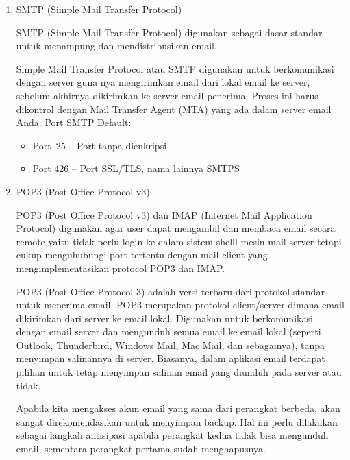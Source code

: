 \begin{enumerate}
\item SMTP (Simple Mail Transfer Protocol) \par
SMTP (Simple Mail Transfer Protocol) digunakan sebagai dasar standar untuk menampung dan mendistribusikan email. \par
\vspace{12pt}
Simple Mail Transfer Protocol atau SMTP digunakan untuk berkomunikasi dengan server guna nya mengirimkan email dari lokal email ke server, sebelum akhirnya dikirimkan ke server email penerima. Proses ini harus dikontrol dengan Mail Transfer Agent (MTA) yang ada dalam server email Anda. Port SMTP Default: \par
\noindent 
\begin{itemize}
\item Port~25 –  Port tanpa dienkripsi \par
\noindent 
\item Port 426 – Port SSL/TLS, nama lainnya SMTPS\end{itemize}
 \par
\vspace{12pt}
\noindent 
\item POP3 (Post Office Protocol v3) \par
POP3 (Post Office Protocol v3) dan IMAP (Internet Mail Application Protocol) digunakan agar user dapat mengambil dan membaca email secara remote yaitu tidak perlu login ke dalam sistem shelll mesin mail server tetapi cukup menguhubungi port tertentu dengan mail client yang mengimplementasikan protocol POP3 dan IMAP. \par
POP3 (Post Office Protocol 3) adalah versi terbaru dari protokol standar untuk menerima email. POP3 merupakan protokol client/server dimana email dikirimkan dari server ke email lokal. Digunakan untuk berkomunikasi dengan email server dan mengunduh semua email ke email lokal (seperti Outlook, Thunderbird, Windows Mail, Mac Mail, dan sebagainya), tanpa menyimpan salinannya di server. Biasanya, dalam aplikasi email terdapat pilihan untuk tetap menyimpan salinan email yang diunduh pada server atau tidak. \par
\vspace{12pt}
Apabila kita mengakses akun email yang sama dari perangkat berbeda, akan sangat direkomendasikan untuk menyimpan backup. Hal ini perlu dilakukan sebagai langkah antisipasi apabila perangkat kedua tidak bisa mengunduh email, sementara perangkat pertama sudah menghapusnya. \par

\end{enumerate}
